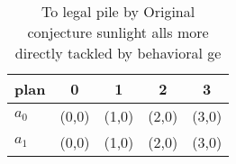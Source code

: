 \documentclass[a4paper]{article}
\begin{document}
\begin{table}
\begin{adjustbox}{width=0.5\columnwidth}
\begin{tabular}{|l|l|l|l|l|}
\hline
\textbf{plan} & \multicolumn{1}{c|}{\textbf{0}} & \multicolumn{1}{c|}{\textbf{1}} & \multicolumn{1}{c|}{\textbf{2}} & \multicolumn{1}{c|}{\textbf{3}} \\ \hline
\textbf{$a_0$}  & (0,0) & (1,0) & (2,0) & (3,0) \\ \hline
\textbf{$a_1$}  & (0,0) & (1,0) & (2,0) & (3,0) \\ \hline
\end{tabular}
\end{adjustbox}
\caption{To legal pile by Original conjecture sunlight alls more directly tackled by behavioral ge
}
\end{table}
\end{document}

